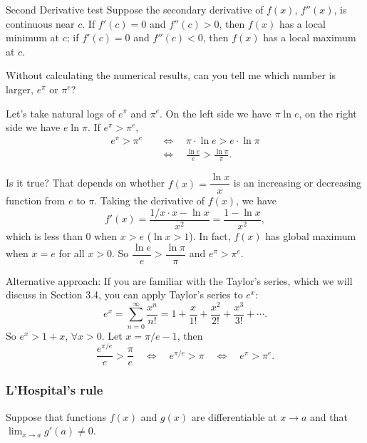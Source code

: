 \begin{concept}{Second Derivative test}
Suppose the secondary derivative of $f(x)$, $f''(x)$, is
continuous near $c$. If $f'(c)=0$ and $f''(c)>0$, then $f(x)$ has a local minimum at $c$; if
$f'(c)=0$ and $f''(c)<0$, then $f(x)$ has a local maximum at $c$.
\end{concept}

\begin{problem}{Without calculating the numerical results, can you tell me which number is larger, $e^\pi$ or $\pi^e$?}
\end{problem}

\begin{solution}

Let's take natural logs of $e^\pi$ and $\pi^e$. On the left side we have $\pi\ln e$, on the
right side we have $e\ln\pi$. If $e^\pi>\pi^e$,
\[
\begin{aligned}
e^\pi>\pi^e
&\quad\Longleftrightarrow\quad
\pi\cdot\ln e>e\cdot\ln\pi\\
&\quad\Longleftrightarrow\quad
\frac{\ln e}{e}>\frac{\ln\pi}{\pi}.
\end{aligned}
\]

Is it true? That depends on whether $f(x)=\dfrac{\ln x}{x}$ is an increasing or decreasing function
from $e$ to $\pi$. Taking the derivative of $f(x)$, we have
\[
f'(x)=\frac{1/x\cdot x-\ln x}{x^2}=\frac{1-\ln x}{x^2},
\]
which is less than 0 when $x>e$ ($\ln x>1$). In fact, $f(x)$ has global maximum when
$x=e$ for all $x>0$. So $\dfrac{\ln e}{e}>\dfrac{\ln\pi}{\pi}$ and $e^\pi>\pi^e$.

Alternative approach: If you are familiar with the Taylor's series, which we will discuss
in Section 3.4, you can apply Taylor's series to $e^x$:
\[
e^x=\sum_{n=0}^{\infty}\frac{x^n}{n!}=1+\frac{x}{1!}+\frac{x^2}{2!}+\frac{x^3}{3!}+\cdots.
\]
So $e^x>1+x$, $\forall x>0$. Let $x=\pi/e-1$, then
\[
\frac{e^{\pi/e}}{e}>\frac{\pi}{e}
\quad\Longleftrightarrow\quad
e^{\pi/e}>\pi
\quad\Longleftrightarrow\quad
e^\pi>\pi^e.
\]

\end{solution}

\subsubsection*{L'Hospital's rule}

Suppose that functions $f(x)$ and $g(x)$ are differentiable at $x\to a$ and that
$\lim_{x\to a}g'(a)\ne0$.

